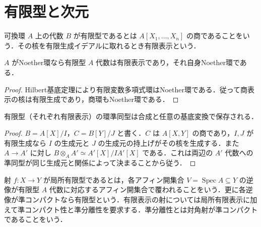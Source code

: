 \section{有限型と次元}
\begin{defn}[有限型代数と有限表示代数]
可換環 $A$ 上の代数 $B$ が有限型であるとは $A[X_1,\ldots,X_n]$ の商であることをいう．その核を有限生成イデアルに取れるとき有限表示という．
\end{defn}
\begin{prop}[Noether環上の有限表示]
$A$ がNoether環なら有限型 $A$ 代数は有限表示であり，それ自身Noether環である．
\end{prop}
\begin{proof}
Hilbert基底定理により有限変数多項式環はNoether環である．従って商表示の核は有限生成であり，商環もNoether環である．
\end{proof}
\begin{prop}[有限型と有限表示の合成及び基底変換]
有限型（それぞれ有限表示）の環準同型は合成と任意の基底変換で保存される．
\end{prop}
\begin{proof}
$B=A[X]/I$，$C=B[Y]/J$ と書く．$C$ は $A[X,Y]$ の商であり，$I,J$ が有限生成なら $I$ の生成元と $J$ の生成元の持上げがその核を生成する．また $A\to A'$ に対し $B\otimes_A A'\simeq A'[X]/IA'[X]$ である．これは両辺の $A'$ 代数への準同型が同じ生成元と関係によって決まることから従う．
\end{proof}
\begin{defn}[局所有限型と有限型の射]
射 $f:X\to Y$ が局所有限型であるとは，各アフィン開集合 $V=\operatorname{Spec}A\subseteq Y$ の逆像が有限型 $A$ 代数に対応するアフィン開集合で覆われることをいう．更に各逆像が準コンパクトなら有限型という．有限表示の射については局所有限表示に加えて準コンパクト性と準分離性を要求する．準分離性とは対角射が準コンパクトであることをいう．
\end{defn}
